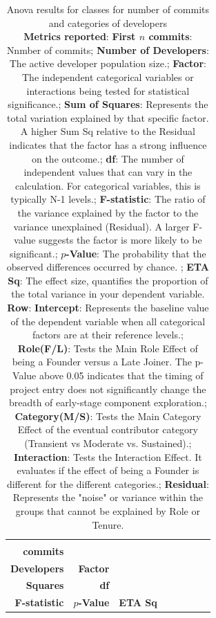 \begin{table}[H]
\centering
\setlength{\tabcolsep}{2pt}
\caption[Standard Anova Results for classes]{Anova results for classes for number of commits and categories of developers\\ \textbf{Metrics reported}:   \textbf{First $n$ commits}: Nnmber of commits;  \textbf{Number of Developers}: The active developer population size.;  \textbf{Factor}: The independent categorical variables or interactions being tested for statistical significance.;  \textbf{Sum of Squares}: Represents the total variation explained by that specific factor. A higher Sum Sq relative to the Residual indicates that the factor has a strong influence on the outcome.;  \textbf{df}: The number of independent values that can vary in the calculation. For categorical variables, this is typically N-1 levels.;  \textbf{F-statistic}: The ratio of the variance explained by the factor to the variance unexplained (Residual). A larger F-value suggests the factor is more likely to be significant.;  \textbf{$p$-Value}: The probability that the observed differences occurred by chance. ;  \textbf{ETA Sq}: The effect size, quantifies the proportion of the total variance in your dependent variable.
\\ \textbf{Row}:   \textbf{Intercept}: Represents the baseline value of the dependent variable when all categorical factors are at their reference levels.;  \textbf{Role(F/L)}: Tests the Main Role Effect of being a Founder versus a Late Joiner. The p-Value above 0.05 indicates that the timing of project entry does not significantly change the breadth of early-stage component exploration.;  \textbf{Category(M/S)}: Tests the Main Category Effect of the eventual contributor category (Transient vs Moderate vs. Sustained).;  \textbf{Interaction}: Tests the Interaction Effect. It evaluates if the effect of being a Founder is different for the different categories.;  \textbf{Residual}: Represents the "noise" or variance within the groups that cannot be explained by Role or Tenure.
}
\begin{tabular}{r r l r r r r r}
\toprule
\makecell[t]{\textbf{First $n$}\\\textbf{commits}} & \makecell[t]{\textbf{Number of}\\\textbf{Developers}} & \textbf{Factor} & \makecell[t]{\textbf{Sum of}\\\textbf{Squares}} & \textbf{df} & \makecell[t]{\textbf{}\\\textbf{F-statistic}} & \textbf{$p$-Value} & \textbf{ETA Sq} \\ 

\end{tabular}
\end{table}
